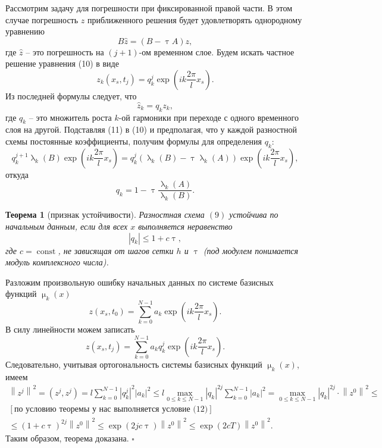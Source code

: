 \documentclass[a4paper, 12pt]{report}
\numberwithin{equation}{section}
\newenvironment{Proof} %
{\par\noindent{$\blacklozenge$}} %
{\hfill$\scriptstyle\square$}
\renewcommand{\leq}{\leqslant}
\renewcommand{\tau}{\uptau}
\renewcommand{\lambda}{\uplambda}
\renewcommand{\mu}{\upmu}
\newcommand{\const}{\operatorname{const}}
\newcommand\Norm[1]{\left\| #1 \right\|}
\newtheorem*{theorem}{Теорема}
\begin{document}
 Рассмотрим задачу для погрешности при фиксированной правой части. В этом случае погрешность $z$ приближенного решения будет удовлетворять однородному уравнению
 \begin{equation}
	 	B \hat z = (B - \tau A)z,
 \end{equation} 
 где $\hat z$ -- это погрешность на $(j+1)$-ом временном слое. Будем искать частное решение уравнения (10) в виде
 \begin{equation}
	 	z_k(x_s, t_j) = q_k^j \exp \left(ik \frac {2\pi}lx_s\right).
 \end{equation}
 Из последней формулы следует, что
 $$\hat z_k = q_kz_k,$$
 где $q_k$ -- это множитель роста $k$-ой гармоники при переходе с одного временного слоя на другой. Подставляя (11) в (10) и предполагая, что у каждой разностной схемы постоянные коэффициенты, получим формулы для определения $q_k$:
 $$q_k^{j+1}\lambda _k(B)  \exp \left(ik \frac {2\pi}lx_s\right) = q_k^j (\lambda _k (B) - \tau \lambda_k (A)) \exp \left(ik \frac {2\pi}lx_s\right),$$
 откуда
 $$q_k = 1 - \tau \dfrac{\lambda _k( A)}{\lambda_k (B)}.$$
 \begin{theorem}
	 	[признак устойчивости]
	 	Разностная схема $(9)$ устойчива по начальным данным, если для всех $x$ выполняется неравенство
	 	\begin{equation}
	 		|q_k| \leq 1 + c\tau,
	 	\end{equation}
	 	где $c = \const$, не зависящая от шагов сетки $h$ и $\tau$
	 	(под модулем понимается модуль комплексного числа).
 \end{theorem}
 \begin{Proof}
	 	Разложим произвольную ошибку начальных данных по системе базисных функций $\mu_k(x)$
	 	$$z(x_s, t_0) = \sum_{k=0}^{N-1}a_k \exp \left(ik \frac {2\pi}lx_s\right).$$
	 	В силу линейности можем записать
	 	$$z(x_s, t_j) = \sum_{k=0}^{N-1}a_kq_k^j \exp \left(ik \frac {2\pi}lx_s\right).$$
	 	Следовательно, учитывая ортогональность системы базисных функций $\mu_k(x)$, имеем
	 	\begin{multline*}
	 		\Norm{z^j}^2 = (z^j, z^j) = l \sum_{k=0}^{N-1} |q_k^j|^2 |a_k|^2 \leq l \underset{0 \leq k \leq N-1}{\max} |q_k|^{2j} \sum_{k=0}^{N-1} |a_k|^2 =\underset{0 \leq k \leq N-1}{\max} |q_k|^{2j} \cdot \Norm{z^0}^2\leq \\
	 		[\text{по условию теоремы у нас выполняется условие (12)}]\\ \leq (1+c\tau)^{2j}\Norm{z^0}^2\leq \exp (2j c \tau)\Norm{z^0}^2 \leq \exp(2 c T)\Norm{z^0}^2.
	 	\end{multline*}
 Таким образом, теорема доказана.
 \end{Proof}\\\\
\end{document}
